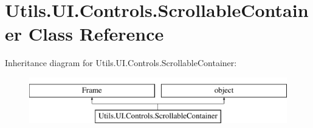 \hypertarget{class_c_utils_1_1_utils_1_1_u_i_1_1_controls_1_1_scrollable_container}{}\section{Utils.\+U\+I.\+Controls.\+Scrollable\+Container Class Reference}
\label{class_c_utils_1_1_utils_1_1_u_i_1_1_controls_1_1_scrollable_container}
Inheritance diagram for Utils.\+U\+I.\+Controls.\+Scrollable\+Container\+:\begin{figure}[H]
\begin{center}
\leavevmode
\includegraphics[height=2.000000cm]{class_c_utils_1_1_utils_1_1_u_i_1_1_controls_1_1_scrollable_container}
\end{center}
\end{figure}
